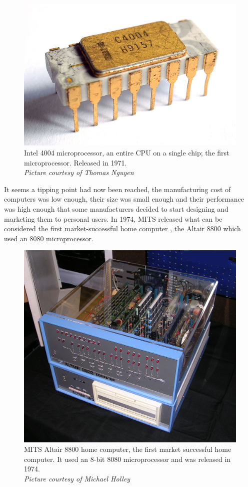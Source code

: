 \begin{figure} \begin{center}
\includegraphics[width=.3\linewidth]{pics/intel_4004} 
\end{center} 
\caption{Intel 4004 microprocessor, an entire CPU on a single chip; the first microprocessor. Released in 1971.\\ \textit{\small{Picture courtesy of Thomas Nguyen}}}
\end{figure} 


It seems a tipping point had now been reached, the manufacturing cost of computers was low enough, their size was small enough and their performance was high enough that some manufacturers decided to start designing and marketing them to personal users. In 1974, MITS released what can be considered the first market-successful home computer 
\cite{Dorf95}, the Altair 8800 which used an 8080 microprocessor.

\begin{figure} \begin{center}
\includegraphics[width=.3\linewidth]{pics/altair_8800_computer} 
\end{center} 
\caption{MITS Altair 8800 home computer, the first market successful home computer. It used an 8-bit 8080 microprocessor and was released in 1974.\\ \textit{\small{Picture courtesy of  Michael Holley}}}
\end{figure}


